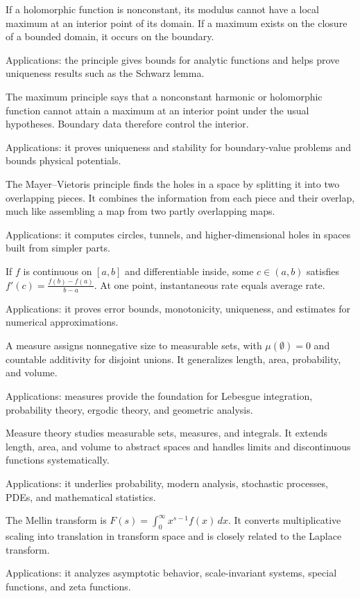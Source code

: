If a holomorphic function is nonconstant, its modulus cannot have a local maximum at an interior point of its domain. If a maximum exists on the closure of a bounded domain, it occurs on the boundary. \par\noindent Applications: the principle gives bounds for analytic functions and helps prove uniqueness results such as the Schwarz lemma.

The maximum principle says that a nonconstant harmonic or holomorphic function cannot attain a maximum at an interior point under the usual hypotheses. Boundary data therefore control the interior. \par\noindent Applications: it proves uniqueness and stability for boundary-value problems and bounds physical potentials.

The Mayer--Vietoris principle finds the holes in a space by splitting it into two overlapping pieces. It combines the information from each piece and their overlap, much like assembling a map from two partly overlapping maps. \par\noindent Applications: it computes circles, tunnels, and higher-dimensional holes in spaces built from simpler parts.

If $f$ is continuous on $[a,b]$ and differentiable inside, some $c\in(a,b)$ satisfies $f'(c)=\frac{f(b)-f(a)}{b-a}$. At one point, instantaneous rate equals average rate. \par\noindent Applications: it proves error bounds, monotonicity, uniqueness, and estimates for numerical approximations.

A measure assigns nonnegative size to measurable sets, with $\mu(\emptyset)=0$ and countable additivity for disjoint unions. It generalizes length, area, probability, and volume. \par\noindent Applications: measures provide the foundation for Lebesgue integration, probability theory, ergodic theory, and geometric analysis.

Measure theory studies measurable sets, measures, and integrals. It extends length, area, and volume to abstract spaces and handles limits and discontinuous functions systematically. \par\noindent Applications: it underlies probability, modern analysis, stochastic processes, PDEs, and mathematical statistics.

The Mellin transform is $F(s)=\int_0^\infty x^{s-1}f(x)\,dx$. It converts multiplicative scaling into translation in transform space and is closely related to the Laplace transform. \par\noindent Applications: it analyzes asymptotic behavior, scale-invariant systems, special functions, and zeta functions.

